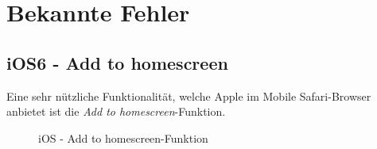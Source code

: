 \section{Bekannte Fehler}

\subsection{iOS6 - Add to homescreen}
Eine sehr nützliche Funktionalität, welche Apple im Mobile Safari-Browser anbietet ist die \emph{Add to homescreen}-Funktion.

\begin{figure}[H]
\hfill
{}
\hfill
{}
\hfill
{}
\caption{iOS - Add to homescreen-Funktion}
\end{figure}

